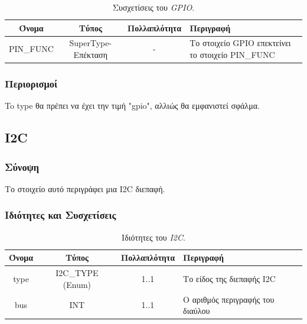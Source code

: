 \begin{table}[H]
	\begin{center}
		\caption{Συσχετίσεις του \textit{GPIO}.}
		\label{tab:gpio2}
		\begin{tabular}{ | c | c | c| m{5.5cm} | }
			\hline
			\rowcolor{Gray}
			Όνομα & Τύπος & Πολλαπλότητα & Περιγραφή \\
			\hline
			PIN\_FUNC & SuperType-Επέκταση & - &  Το στοιχείο GPIO επεκτείνει το στοιχείο PIN\_FUNC \\
			\hline
		\end{tabular}
	\end{center}
\end{table}

\subsubsection*{Περιορισμοί}

\noindent To type θα πρέπει να έχει την τιμή "gpio", αλλιώς θα εμφανιστεί σφάλμα.

\subsection{I2C}
\label{subsec:i2c}

\subsubsection*{Σύνοψη}

\noindent Το στοιχείο αυτό περιγράφει μια I2C διεπαφή.

\subsubsection*{Ιδιότητες και Συσχετίσεις}

\begin{table}[H]
	\begin{center}
		\caption{Ιδιότητες του \textit{I2C}.}
		\label{tab:i2c1}
		\begin{tabular}{ | c | c | c| m{5.5cm} | }
			\hline
			\rowcolor{Gray}
			Όνομα & Τύπος & Πολλαπλότητα & Περιγραφή \\
			\hline
			type & I2C\_TYPE (Enum) & 1..1 & Το είδος της διεπαφής I2C \\
			\hline
			bus & INT & 1..1 & Ο αριθμός περιγραφής του διαύλου \\
			\hline
		\end{tabular}
	\end{center}
\end{table}

